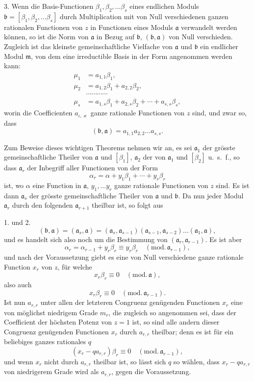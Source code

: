 \documentclass{article}
\begin{document}
3. Wenn die Basis-Functionen $\beta_{1}, \beta_{2}, \ldots \beta_{s}$ eines endlichen Moduls $\mathfrak{b} = [\beta_{1}, \beta_{2}, \ldots \beta_{s}]$ durch Multiplication mit von Null verschiedenen ganzen rationalen Functionen von $z$ in Functionen eines Moduls $\mathfrak{a}$ verwandelt werden können, so ist die Norm von $\mathfrak{a}$ in Bezug auf $\mathfrak{b}$, $(\mathfrak{b}, \mathfrak{a})$ von Null verschieden. Zugleich ist das kleinste gemeinschaftliche Vielfache von $\mathfrak{a}$ und $\mathfrak{b}$ ein endlicher Modul $\mathfrak{m}$, von dem eine irreductible Basis in der Form angenommen werden kann:
\[ \begin{aligned} \mu_{1} &= a_{1,1}\beta_{1}, \\ \mu_{2} &= a_{1,2}\beta_{1} + a_{2,2}\beta_{2}, \\ &\cdots\cdots\cdots\cdots \\ \mu_{s} &= a_{1,s}\beta_{1} + a_{2,s}\beta_{2} + \cdots + a_{s,s}\beta_{s}, \end{aligned} \]
worin die Coefficienten $a_{\iota,\varkappa}$ ganze rationale Functionen von $z$ sind, und zwar so, dass
\[ (\mathfrak{b}, \mathfrak{a}) = a_{1,1}a_{2,2}\ldots a_{s,s}. \]

Zum Beweise dieses wichtigen Theorems nehmen wir an, es sei $\mathfrak{a}_{1}$ der grösste gemeinschaftliche Theiler von $\mathfrak{a}$ und $[\beta_{1}]$, $\mathfrak{a}_{2}$ der von $\mathfrak{a}_{1}$ und $[\beta_{2}]$ u.\ s.\ f., so dass $\mathfrak{a}_{r}$ der Inbegriff aller Functionen von der Form
\[ \alpha_{r} = \alpha + y_{1}\beta_{1} + \cdots + y_{r}\beta_{r} \]
ist, wo $\alpha$ eine Function in $\mathfrak{a}$, $y_{1}, \ldots y_{r}$ ganze rationale Functionen von $z$ sind. Es ist dann $\mathfrak{a}_{s}$ der grösste gemeinschaftliche Theiler von $\mathfrak{a}$ und $\mathfrak{b}$. Da nun jeder Modul $\mathfrak{a}_{r}$ durch den folgenden $\mathfrak{a}_{r+1}$ theilbar ist, so folgt aus

1. und 2.
\[ (\mathfrak{b}, \mathfrak{a}) = (\mathfrak{a}_{s}, \mathfrak{a}) = (\mathfrak{a}_{s}, \mathfrak{a}_{s-1})(\mathfrak{a}_{s-1}, \mathfrak{a}_{s-2})\ldots(\mathfrak{a}_{1}, \mathfrak{a}), \]
und es handelt sich also noch um die Bestimmung von $(\mathfrak{a}_{r}, \mathfrak{a}_{r-1})$. Es ist aber
\[ \alpha_{r} = \alpha_{r-1} + y_{r}\beta_{r} \equiv y_{r}\beta_{r} \quad (\text{mod.}\,\mathfrak{a}_{r-1}), \]
und nach der Voraussetzung giebt es eine von Null verschiedene ganze rationale Function $x_{r}$ von $z$, für welche
\[ x_{r}\beta_{r} \equiv 0 \quad (\text{mod.}\,\mathfrak{a}), \]
also auch
\[ x_{r}\beta_{r} \equiv 0 \quad (\text{mod.}\,\mathfrak{a}_{r-1}). \]
Ist nun $a_{r,r}$ unter allen der letzteren Congruenz genügenden Functionen $x_{r}$ eine von möglichst niedrigem Grade $m_{r}$, die zugleich so angenommen sei, dass der Coefficient der höchsten Potenz von $z = 1$ ist, so sind alle andern dieser Congruenz genügenden Functionen $x_{r}$ durch $a_{r,r}$ theilbar; denn es ist für ein beliebiges ganzes rationales $q$
\[ (x_{r} - qa_{r,r})\beta_{r} \equiv 0 \quad (\text{mod.}\,\mathfrak{a}_{r-1}), \]
und wenn $x_{r}$ nicht durch $a_{r,r}$ theilbar ist, so lässt sich $q$ so wählen, dass $x_{r} - qa_{r,r}$ von niedrigerem Grade wird als $a_{r,r}$, gegen die Voraussetzung.
\end{document}
